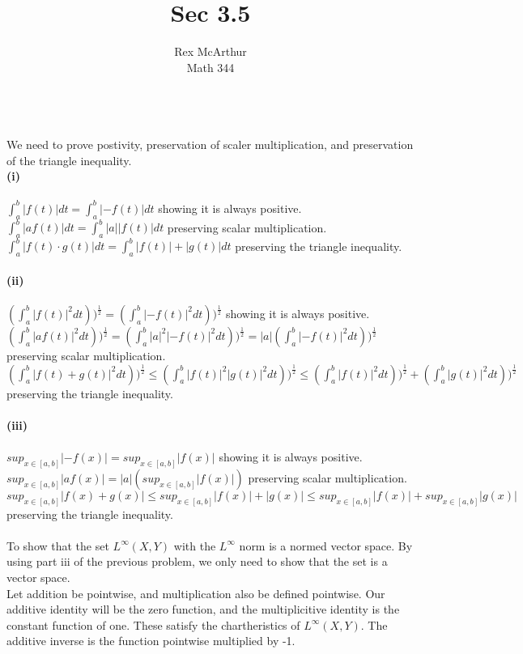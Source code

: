 \documentclass[letterpaper,12pt]{article}
\title{Sec 3.5}
\author{Rex McArthur\\Math 344}
\theoremstyle{definition}
\begin{document}
\maketitle
{}\\
We need to prove postivity, preservation of scaler multiplication, and preservation of the triangle inequality.\\
\textbf{(i)} \\ \\
$\int_{a}^{b}|f(t)| dt = \int_{a}^{b}|-f(t)| dt$ showing it is always positive. \\
$\int_{a}^{b}|af(t)| dt = \int_{a}^{b}|a||f(t)| dt$ preserving scalar multiplication. \\
$\int_{a}^{b}|f(t) \cdot g(t)| dt = \int_{a}^{b}|f(t)| + |g(t)| dt$ preserving the triangle inequality. \\ \\
\textbf{(ii)} \\ \\ 
$(\int_{a}^{b}|f(t)|^{2} dt))^{\frac{1}{2}} = (\int_{a}^{b}|-f(t)|^{2} dt))^{\frac{1}{2}}$ showing it is always positive. \\
$(\int_{a}^{b}|af(t)|^{2} dt))^{\frac{1}{2}} = (\int_{a}^{b}|a|^{2}|-f(t)|^{2} dt))^{\frac{1}{2}} = |a|(\int_{a}^{b}|-f(t)|^{2} dt))^{\frac{1}{2}}$ preserving scalar multiplication. \\
$(\int_{a}^{b}|f(t)+g(t)|^{2} dt))^{\frac{1}{2}} \leq (\int_{a}^{b}|f(t)|^{2}|g(t)|^{2} dt))^{\frac{1}{2}} \leq (\int_{a}^{b}|f(t)|^{2} dt))^{\frac{1}{2}} + (\int_{a}^{b}|g(t)|^{2} dt))^{\frac{1}{2}}$ preserving the triangle inequality. \\ \\
\textbf{(iii)} \\ \\ 
$sup_{x \in [a,b]} |-f(x)| = sup_{x \in [a,b]} |f(x)|$ showing it is always positive.\\
$ sup_{x \in [a,b]} |af(x)| = |a| (sup_{x \in [a,b]} |f(x)|)$ preserving scalar multiplication.\\
$sup_{x \in [a,b]} |f(x) + g(x)| \leq sup_{x \in [a,b]} |f(x)| + |g(x)| \leq sup_{x \in [a,b]} |f(x)|+ sup_{x \in [a,b]} |g(x)|$ preserving the triangle inequality.\\

\\
To show that the set $L^{\infty}(X,Y)$ with the $L^{\infty}$ norm is a normed vector space. By using part iii of the previous problem, we only need to show that the set is a vector space.
\\
Let addition be pointwise, and multiplication also be defined pointwise. Our additive identity will be the zero function, and the multiplicitive identity is the constant function of one. These satisfy the chartheristics of $L^{\infty}(X,Y)$. The additive inverse is the function pointwise multiplied by -1.
\end{document}
